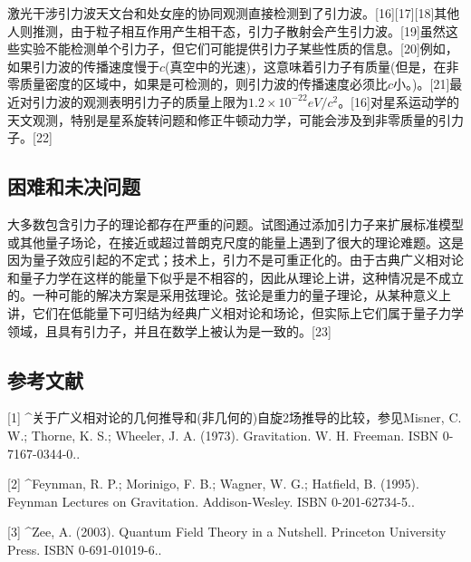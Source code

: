 激光干涉引力波天文台和处女座的协同观测直接检测到了引力波。[16][17][18]其他人则推测，由于粒子相互作用产生相干态，引力子散射会产生引力波。[19]虽然这些实验不能检测单个引力子，但它们可能提供引力子某些性质的信息。[20]例如，如果引力波的传播速度慢于$c$(真空中的光速)，这意味着引力子有质量(但是，在非零质量密度的区域中，如果是可检测的，则引力波的传播速度必须比$c$小。)。[21]最近对引力波的观测表明引力子的质量上限为$1.2\times10^{-22} eV/c^{2}$。[16]对星系运动学的天文观测，特别是星系旋转问题和修正牛顿动力学，可能会涉及到非零质量的引力子。[22]

\subsection{困难和未决问题}
大多数包含引力子的理论都存在严重的问题。试图通过添加引力子来扩展标准模型或其他量子场论，在接近或超过普朗克尺度的能量上遇到了很大的理论难题。这是因为量子效应引起的不定式；技术上，引力不是可重正化的。由于古典广义相对论和量子力学在这样的能量下似乎是不相容的，因此从理论上讲，这种情况是不成立的。一种可能的解决方案是采用弦理论。弦论是重力的量子理论，从某种意义上讲，它们在低能量下可归结为经典广义相对论和场论，但实际上它们属于量子力学领域，且具有引力子，并且在数学上被认为是一致的。[23]

\subsection{参考文献}
[1]
^关于广义相对论的几何推导和(非几何的)自旋2场推导的比较，参见Misner, C. W.; Thorne, K. S.; Wheeler, J. A. (1973). Gravitation. W. H. Freeman. ISBN 0-7167-0344-0..

[2]
^Feynman, R. P.; Morinigo, F. B.; Wagner, W. G.; Hatfield, B. (1995). Feynman Lectures on Gravitation. Addison-Wesley. ISBN 0-201-62734-5..

[3]
^Zee, A. (2003). Quantum Field Theory in a Nutshell. Princeton University Press. ISBN 0-691-01019-6..

